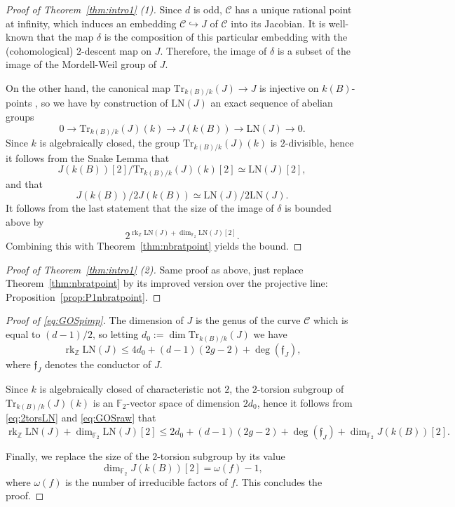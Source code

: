 \documentclass[11pt]{article}
\newcommand{\Z}{\ensuremath{\mathbb{Z}}}
\newcommand{\F}{\ensuremath{\mathbb{F}}}
\theoremstyle{plain}
\theoremstyle{definition}
\DeclareMathOperator{\rk}{rk}
\newcommand{\LN}{\mathrm{LN}}
\newcommand{\Tr}{\mathrm{Tr}}
\begin{document}
\begin{proof}[Proof of Theorem~\ref{thm:intro1} (1)]
Since $d$ is odd, $\mathcal{C}$ has a unique rational point at infinity, which induces an embedding $\mathcal{C}\hookrightarrow J$ of $\mathcal{C}$ into its Jacobian. It is well-known \cite{schaefer95} that the map $\delta$ is the composition of this particular embedding with the (cohomological) $2$-descent map on $J$. Therefore, the image of $\delta$ is a subset of the image of the Mordell-Weil group of $J$.

On the other hand, the canonical map $\Tr_{k(B)/k}(J)\to J$ is injective on $k(B)$-points \cite[Theorem~6.12]{conrad06}, so we have by construction of $\LN(J)$ an exact sequence of abelian groups
$$
0 \longrightarrow \Tr_{k(B)/k}(J)(k) \longrightarrow  J(k(B)) \longrightarrow  \LN(J) \to 0.
$$
Since $k$ is algebraically closed, the group $\Tr_{k(B)/k}(J)(k)$ is $2$-divisible, hence it follows from the Snake Lemma that
\begin{equation}
\label{eq:2torsLN}
J(k(B))[2]/\Tr_{k(B)/k}(J)(k)[2] \simeq \LN(J)[2],
\end{equation}
and that
$$
J(k(B))/2J(k(B)) \simeq \LN(J)/2\LN(J).
$$
It follows from the last statement that the size of the image of $\delta$ is bounded above by
$$
2^{\rk_\Z \LN(J) + \dim_{\F_2} \LN(J)[2]}.
$$
Combining this with Theorem~\ref{thm:nbratpoint} yields the bound.
\end{proof}


\begin{proof}[Proof of Theorem~\ref{thm:intro1} (2)]
Same proof as above, just replace Theorem~\ref{thm:nbratpoint} by its improved version over the projective line: Proposition~\ref{prop:P1nbratpoint}.
\end{proof}


\begin{proof}[Proof of \eqref{eq:GOSpimp}]
The dimension of $J$ is the genus of the curve $\mathcal{C}$ which is equal to $(d-1)/2$, so letting $d_0 :=\dim \Tr_{k(B)/k}(J)$ we have \cite[Th\'eor\`eme 3]{raynaud95}
\begin{equation}
\label{eq:GOSraw}
\rk_\Z \LN(J) \leq 4d_0 + (d-1)(2g-2)+ \deg(\mathfrak{f}_J),
\end{equation}
where $\mathfrak{f}_J$ denotes the conductor of $J$.

Since $k$ is algebraically closed of characteristic not $2$, the $2$-torsion subgroup of $\Tr_{k(B)/k}(J)(k)$ is an $\F_2$-vector space of dimension $2d_0$, hence it follows from \eqref{eq:2torsLN} and \eqref{eq:GOSraw} that
$$
\rk_\Z \LN(J) + \dim_{\F_2} \LN(J)[2] \leq 2d_0 + (d-1)(2g-2)+ \deg(\mathfrak{f}_J) + \dim_{\F_2} J(k(B))[2].
$$

Finally, we replace the size of the $2$-torsion subgroup by its value
$$
\dim_{\F_2} J(k(B))[2] = \omega(f)-1,
$$
where $\omega(f)$ is the number of irreducible factors of $f$. This concludes the proof.
\end{proof}
\end{document}
